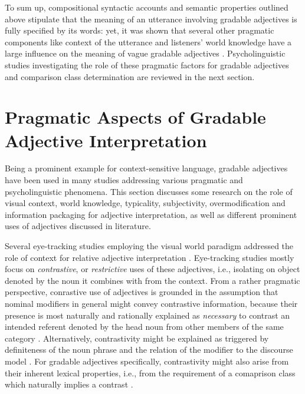 To sum up, compositional syntactic accounts and semantic properties outlined above stipulate that the meaning of an utterance involving gradable adjectives is fully specified by its words: yet, it was shown that several other pragmatic components like context of the utterance and listeners’ world knowledge have a large influence on the meaning of vague gradable adjectives \parencite[e.g.,][]{tessler2017warm, Kennedy2007, sedivy1999}. Psycholinguistic studies investigating the role of these pragmatic factors for gradable adjectives and comparison class determination are reviewed in the next section. 

\section{Pragmatic Aspects of Gradable Adjective Interpretation}
\label{2.4.}
Being a prominent example for context-sensitive language, gradable adjectives have been used in many studies addressing various pragmatic and psycholinguistic phenomena. This section discusses some research on the role of visual context, world knowledge, typicality, subjectivity, overmodification and information packaging for adjective interpretation, as well as different prominent uses of adjectives discussed in literature. %

Several eye-tracking studies employing the  visual world paradigm addressed the role of context for relative adjective interpretation \parencite[e.g.,][]{sedivy1999, Aparicio2016}.
Eye-tracking studies mostly focus on \textit{contrastive}, or \textit{restrictive} uses of these adjectives, i.e., isolating on object denoted by the noun it combines with from the context. From a rather pragmatic perspective, conrastive use of adjectives is grounded in the assumption that nominal modifiers in general might convey contrastive information, because their presence is most naturally and rationally explained as \emph{necessary} to contrast an intended referent denoted by the head noun from other members of the same category \parencite{sedivy1999, clifton1989ambiguity}. Alternatively, contrastivity might be explained as triggered by definiteness of the noun phrase and the relation of the modifier to the discourse model \parencite{sedivy1999, steedman1989ambiguity}. For gradable adjectives specifically, contrastivity might also arise from their inherent lexical properties, i.e., from the requirement of a comaprison class which naturally implies a contrast \parencite{Bierwisch1989, sedivy1999}. 

